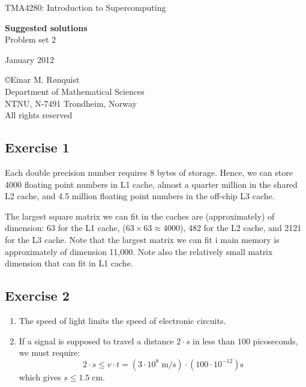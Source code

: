 \documentclass[11pt]{article}
\begin{document}
 
\LARGE
\begin{center}
TMA4280: Introduction to Supercomputing
\end{center}
\vspace{1in}

\begin{center}
{\bf Suggested solutions} \\
Problem set 2
\end{center}

\Large
\vspace{0.5in}
\begin{center}
January 2012
\end{center}

\vspace{0.5in}

\begin{center}
\copyright Einar M. R{\o}nquist \\
Department of Mathematical Sciences\\
NTNU, N-7491 Trondheim, Norway\\
All rights reserved
\end{center}

\large

\newpage

\subsection*{Exercise 1}
Each double precision number requires 8 bytes of storage. 
Hence, we can store 4000 floating point numbers in L1 cache, 
almost a quarter million in the shared L2 cache, 
and 4.5 million floating point numbers in the off-chip L3 cache. 

The largest square matrix we can fit in the caches are (approximately) 
of dimension:  63 for the L1 cache, 
($63 \times 63 \approx 4000$), 482 for the L2 cache, and 2121 for the L3 cache. 
Note that the largest matrix we can fit i main memory is approximately of dimension 11,000. Note also the relatively small matrix dimension that can fit in L1 cache. 

\subsection*{Exercise 2}
\begin{enumerate}
\item The speed of light limits the speed of electronic circuits.
\item If a signal is supposed to travel a distance $2\cdot s$ in less
    than $100$ picoseconds, we must require:
    \begin{displaymath} 
        2\cdot s\leq v\cdot t=(3\cdot 10^{8}\;\mbox{m/s})\cdot (100\cdot 10^{-12})
        \mbox{s}
    \end{displaymath} 
    which gives $s\leq 1.5\;\mbox{cm}$.
\end{enumerate}
\end{document}
